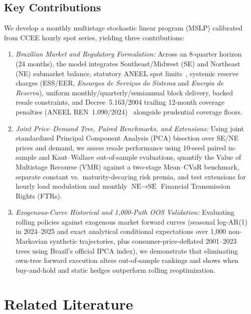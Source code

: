 \documentclass[10pt,journal]{IEEEtran}
\begin{document}
\subsection{Key Contributions}
We develop a monthly multistage stochastic linear program (MSLP) calibrated from CCEE hourly spot series, yielding three contributions:
\begin{enumerate}
    \item \textit{Brazilian Market and Regulatory Formulation:} Across an 8-quarter horizon (24 months), the model integrates Southeast/Midwest (SE) and Northeast (NE) submarket balance, statutory ANEEL spot limits~\cite{ANEEL_REH2828_2020,ANEEL_REH2994_2021,ANEEL_REH3167_2022,ANEEL_REH3304_2023,ANEEL_Despacho3625_2024}, systemic reserve charges (ESS/EER, \textit{Encargos de Servi\c{c}os do Sistema} and \textit{Energia de Reserva}), uniform monthly/quarterly/semiannual block delivery, backed resale constraints, and Decree~5.163/2004 trailing 12-month coverage penalties (ANEEL REN~1.090/2024)~\cite{ANEEL_REN1090_2024,ANEEL_Despacho3176_2024} alongside prudential coverage floors.
    \item \textit{Joint Price--Demand Tree, Paired Benchmarks, and Extensions:} Using joint standardized Principal Component Analysis (PCA) bisection over SE/NE prices and demand, we assess resale performance using 10-seed paired in-sample and Kaut--Wallace out-of-sample evaluations, quantify the Value of Multistage Recourse ($\mathrm{VMR}$) against a two-stage Mean--CVaR benchmark, separate constant vs.\ maturity-decaying risk premia, and test extensions for hourly load modulation and monthly $\text{NE}\to\text{SE}$ Financial Transmission Rights (FTRs).
    \item \textit{Exogenous-Curve Historical and 1,000-Path OOS Validation:} Evaluating rolling policies against exogenous market forward curves (seasonal log-AR(1) in 2024--2025 and exact analytical conditional expectations over 1,000 non-Markovian synthetic trajectories, plus consumer-price-deflated 2001--2023 trees using Brazil's official IPCA index), we demonstrate that eliminating own-tree forward execution alters out-of-sample rankings and shows when buy-and-hold and static hedges outperform rolling reoptimization.
\end{enumerate}

\section{Related Literature}
\label{sec:lit}
\end{document}
